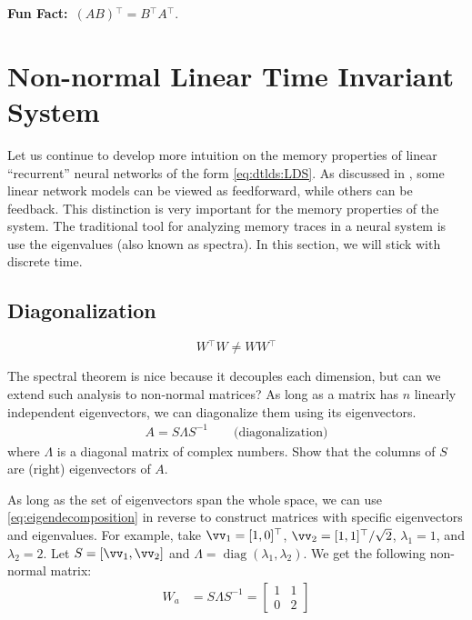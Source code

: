 \documentclass[a4paper,11pt]{exam}
\newcounter{ct}
\newcommand{\inv}{^{-1}}
\newcommand{\trp}{{^\top}} %
\DeclareMathOperator*{\diag}{diag}
\newcommand{\funfact}{\textbf{Fun Fact:}~}
\begin{document}
\begin{questions}
\begin{tcolorbox}
    \funfact $(AB)\trp = B\trp A\trp$.
\end{tcolorbox}


\clearpage
\section{Non-normal Linear Time Invariant System}
Let us continue to develop more intuition on the memory properties of linear ``recurrent'' neural networks of the form \eqref{eq:dtlds:LDS}.
As discussed in \citet{Goldman2009}, some linear network models can be viewed as feedforward, while others can be feedback.
This distinction is very important for the memory properties of the system.
The traditional tool for analyzing memory traces in a neural system is use the eigenvalues (also known as spectra).
In this section, we will stick with discrete time.

\subsection{Diagonalization}
\begin{tcolorbox}[colback=black!1!,title=Non-normal matrices]
    $$W\trp W \neq W W\trp$$
\end{tcolorbox}
The spectral theorem is nice because it decouples each dimension, but can we extend such analysis to non-normal matrices?
As long as a matrix has $n$ linearly independent eigenvectors, we can diagonalize them using its eigenvectors.
\begin{align}\label{eq:eigendecomposition}
A = S \Lambda S\inv  \qquad \text{(diagonalization)}
\end{align}
where $\Lambda$ is a diagonal matrix of complex numbers.
\question Show that the columns of $S$ are (right) eigenvectors of $A$.

As long as the set of eigenvectors span the whole space, we can use \eqref{eq:eigendecomposition} in reverse to construct matrices with specific eigenvectors and eigenvalues.
For example, take $\vv_1 = [1, 0]\trp$, $\vv_2 = [1, 1]\trp / \sqrt{2}$, $\lambda_1 = 1$, and $\lambda_2 = 2$.
Let $S = [\vv_1, \vv_2]$ and $\Lambda = \diag(\lambda_1, \lambda_2)$.
We get the following non-normal matrix:
\begin{align}\label{eq:nnm:ex:a}
W_a &= S \Lambda S\inv =
\begin{bmatrix}
1 & 1\\
0 & 2
\end{bmatrix}
\end{align}


\end{questions}
\end{document}
